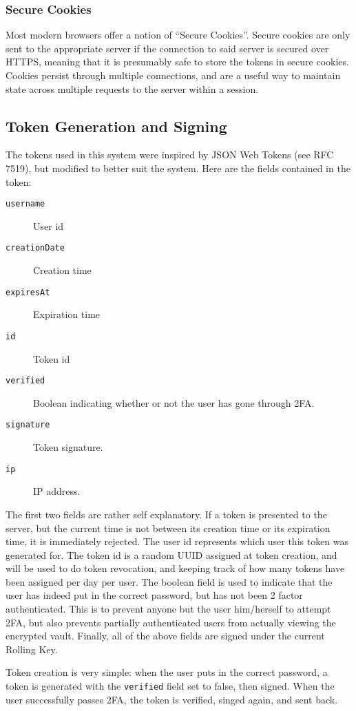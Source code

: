 \documentclass{article}
\begin{document}
\subsubsection{Secure Cookies}
\label{ssub:secure_cookies}
\par Most modern browsers offer a notion of ``Secure Cookies''. Secure cookies are only sent to the appropriate server if the connection to said server is secured over HTTPS, meaning that it is presumably safe to store the tokens in secure cookies. Cookies persist through multiple connections, and are a useful way to maintain state across multiple requests to the server within a session.

\subsection{Token Generation and Signing}
\label{sub:token_generation_and_signing}
\par The tokens used in this system were inspired by JSON Web Tokens (see RFC 7519\cite{bib:RFC7519}), but modified to better suit the system. Here are the fields contained in the token:
\begin{description}
  \item[\texttt{username}] User id
  \item[\texttt{creationDate}] Creation time
  \item[\texttt{expiresAt}] Expiration time
  \item[\texttt{id}] Token id
  \item[\texttt{verified}] Boolean indicating whether or not the user has gone through 2FA.
  \item[\texttt{signature}] Token signature.
  \item[\texttt{ip}] IP address.
\end{description}
\par The first two fields are rather self explanatory. If a token is presented to the server, but the current time is not between its creation time or its expiration time, it is immediately rejected. The user id represents which user this token was generated for. The token id is a random UUID assigned at token creation, and will be used to do token revocation, and keeping track of how many tokens have been assigned per day per user. The boolean field is used to indicate that the user has indeed put in the correct password, but has not been 2 factor authenticated. This is to prevent anyone but the user him/herself to attempt 2FA, but also prevents partially authenticated users from actually viewing the encrypted vault. Finally, all of the above fields are signed under the current Rolling Key.
\par Token creation is very simple: when the user puts in the correct password, a token is generated with the \texttt{verified} field set to false, then signed. When the user successfully passes 2FA, the token is verified, singed again, and sent back.
\end{document}
